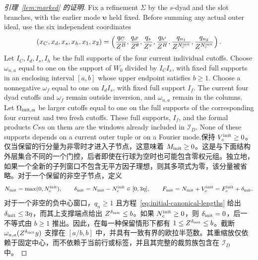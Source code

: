 \documentclass[11pt,a4paper]{article}
\numberwithin{equation}{section}
\numberwithin{figure}{section}
\theoremstyle{definition}
\theoremstyle{remark}
\begin{document}
\begin{proof}[引理~\ref{lem:marked} 的证明]
Fix a refinement \(\Sigma\) by the \(s\)-dyad and the slot branches,
with the earlier mode \(\boldsymbol\upsilon\) held fixed.  Before
summing any actual outer ideal, use the six independent coordinates
\[
 (x_C,x_d,x_s,x_h,x_1,x_2)
 =\left(\frac{q_C}{Z^B},\frac{q_{d'}}{Z^\theta},
 \frac{q_s}{Z^v},\frac{q_{h'}}{Z^H},
 \frac{q_{n_1}}{Z^{N_c^{\rm init}}},
 \frac{q_{n_2}}{Z^{N_c^{\rm init}}}\right).
\]
Let \(I_C,I_d,I_s,I_h\) be the full supports of the four current
individual cutoffs.  Choose \(\omega_{n,a}\) equal to one on the
support of \(W_0\) divided by \(I_CI_s\), with fixed full supports
in an enclosing interval \([a,b]\) whose upper endpoint satisfies
\(b\ge1\).  Choose a nonnegative \(\omega_f\) equal to one on
\(I_dI_s\), with fixed full support \(I_f\).  The current four dyad
cutoffs and \(\omega_f\) remain outside inversion, and
\(\omega_{n,a}\) remain in the columns.  Let
\(\Omega_{{\rm init},\alpha}\) be larger cutoffs equal to one on the
full supports of the corresponding four current and two fresh cutoffs.
These full supports, \(I_f\), and the formal products \(Csn\) on them
are the windows already included in \(\mathcal I_D\).  None of these
supports depends on a current outer tuple or on a Fourier mode.保持 \(V_c^{\rm init}\ge0\)。仅当保留的行分量为非零时才进入子节点，这意味着 \(M_{\rm init}\ge0\)。这是与下面结构外层集合不同的一个门控，后者即使在行球为空时也可能包含零权元组。独立地，如果一个全新的子列窗口不包含无平方因子理想，则其多项式为零，该分量被省略。对于一个保留的非空子节点，定义
\[
 N_{\rm init}=\max(0,N_c^{\rm init}),\qquad
 \delta_{\rm init}=N_{\rm init}-N_c^{\rm init}\in[0,3\eta],\qquad
 F_{\rm init}=N_{\rm init}+V_c^{\rm init}=F_c^{\rm init}+\delta_{\rm init}.
\]
对于一个非空的负中心窗口，\(q_n\ge1\) 且方程~\eqref{eq:initial-canonical-lengths} 给出 \(\delta_{\rm init}\le3\eta\)，而其上支撑端点给出 \(Z^{\delta_{\rm init}}\le b\)。如果 \(N_c^{\rm init}\ge0\)，则 \(\delta_{\rm init}=0\)，后一不等式由 \(b\ge1\) 推出。因此，在每一种保留情形下都有 \(1\le Z^{\delta_{\rm init}}\le b\)。截断 \(\omega_{n,a}(Z^{\delta_{\rm init}}y)\) 支撑在 \([a/b,b]\) 中，并具有一致有界的欧拉半范数。其重缩放仅依赖于固定中心，而不依赖于当前行或标签，并且其完整的裁剪族包含在 \(\mathcal I_D\) 中。


\end{proof}
\end{document}
